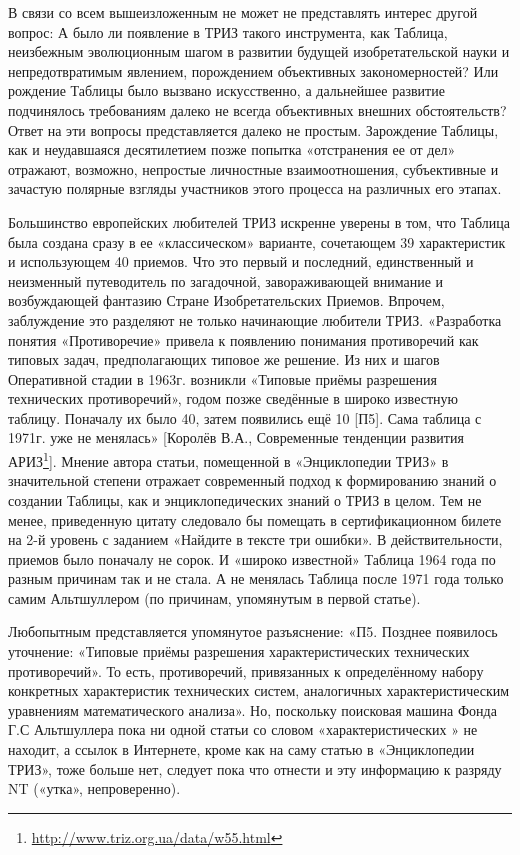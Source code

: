 \documentclass[11pt,a4paper]{article}
\begin{document}
В связи со всем вышеизложенным не может не представлять интерес другой вопрос:
А было ли появление в ТРИЗ такого инструмента, как Таблица, неизбежным
эволюционным шагом в развитии будущей изобретательской науки и
непредотвратимым явлением, порождением объективных закономерностей? Или
рождение Таблицы было вызвано искусственно, а дальнейшее развитие подчинялось
требованиям далеко не всегда объективных внешних обстоятельств? Ответ на эти
вопросы представляется далеко не простым. Зарождение Таблицы, как и
неудавшаяся десятилетием позже попытка «отстранения ее от дел» отражают,
возможно, непростые личностные взаимоотношения, субъективные и зачастую
полярные взгляды участников этого процесса на различных его этапах.

Большинство европейских любителей ТРИЗ искренне уверены в том, что Таблица
была создана сразу в ее «классическом» варианте, сочетающем 39 характеристик и
использующем 40 приемов. Что это первый и последний, единственный и неизменный
путеводитель по загадочной, завораживающей внимание и возбуждающей фантазию
Стране Изобретательских Приемов. Впрочем, заблуждение это разделяют не только
начинающие любители ТРИЗ. «Разработка понятия «Противоречие» привела к
появлению понимания противоречий как типовых задач, предполагающих типовое же
решение. Из них и шагов Оперативной стадии в 1963г. возникли «Типовые приёмы
разрешения технических противоречий», годом позже сведённые в широко известную
таблицу. Поначалу их было 40, затем появились ещё 10 [П5]. Сама таблица с
1971г. уже не менялась» [Королёв В.А., Современные тенденции развития
  АРИЗ\footnote{\url{http://www.triz.org.ua/data/w55.html}}]. Мнение автора
статьи, помещенной в «Энциклопедии ТРИЗ» в значительной степени отражает
современный подход к формированию знаний о создании Таблицы, как и
энциклопедических знаний о ТРИЗ в целом. Тем не менее, приведенную цитату
следовало бы помещать в сертификационном билете на 2-й уровень с заданием
«Найдите в тексте три ошибки». В действительности, приемов было поначалу не
сорок. И «широко известной» Таблица 1964 года по разным причинам так и не
стала. А не менялась Таблица после 1971 года только самим Альтшуллером (по
причинам, упомянутым в первой статье).

Любопытным представляется упомянутое разъяснение: «П5. Позднее появилось
уточнение: «Типовые приёмы разрешения характеристических технических
противоречий». То есть, противоречий, привязанных к определённому набору
конкретных характеристик технических систем, аналогичных характеристическим
уравнениям математического анализа». Но, поскольку поисковая машина Фонда Г.С
Альтшуллера пока ни одной статьи со словом «характеристических » не находит, а
ссылок в Интернете, кроме как на саму статью в «Энциклопедии ТРИЗ», тоже
больше нет, следует пока что отнести и эту информацию к разряду NT («утка»,
непроверенно).
\end{document}
